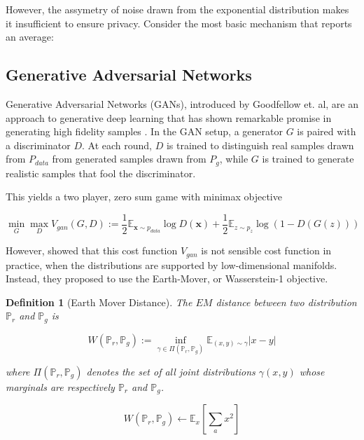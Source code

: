 \documentclass[]{article}
\newtheorem{definition}{Definition}[section]
\theoremstyle{definition}
\begin{document}
However, the assymetry of noise drawn from the exponential distribution makes it insufficient to ensure privacy. Consider the most basic mechanism that reports an average: 


\subsection{Generative Adversarial Networks}

Generative Adversarial Networks (GANs), introduced by Goodfellow et. al, are an approach to generative deep learning that has shown remarkable promise in generating high fidelity samples \cite{GPM+14}. In the GAN setup, a generator $G$ is paired with a discriminator $D$. At each round, $D$ is trained to distinguish real samples drawn from $P_{data}$ from generated samples drawn from $P_g$, while $G$ is trained to generate realistic samples that fool the discriminator. 

This yields a two player, zero sum game with minimax objective

\begin{equation}
    \min_G \max_D V_{gan}(G,D):=\frac{1}{2} \mathbb{E}_{\mathbf{x} \sim p_{data}} \log D(\mathbf{x})+\frac{1}{2} \mathbb{E}_{z \sim p_{z}} \log (1-D(G(z)))
\end{equation}


However, \cite{ACB17} showed that this cost function $V_{gan}$ is not sensible cost function in practice, when the distributions are supported by low-dimensional manifolds. Instead, they proposed to use the Earth-Mover, or Wasserstein-1 objective.

    \begin{definition}[Earth Mover Distance]
        The $EM$ distance between two distribution $\mathbb{P}_r$ and $\mathbb{P}_g$ is 

        \begin{equation}
            W(\mathbb{P}_r, \mathbb{P}_g):=\inf _{\gamma \in \Pi\left(\mathbb{P}_r, \mathbb{P}_g\right)} \mathbb{E}_{(x, y) \sim \gamma}|x-y|
        \end{equation}

        where $\Pi\left(\mathbb{P}_r, \mathbb{P}_g\right)$ denotes the set of all joint distributions $\gamma(x,y)$ whose marginals are respectively  $\mathbb{P}_r$ and $\mathbb{P}_g$.
    \end{definition}
    
    \begin{equation}
        W(\mathbb{P}_r, \mathbb{P}_g) \leftarrow \mathbb{E}_x[\sum_a x^2] 
    \end{equation}
\end{document}
